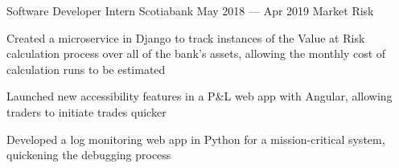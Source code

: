 \begin{cventries}
  \cventry
    {Software Developer Intern}
    {Scotiabank}
    {}
    {May 2018 --- Apr 2019}
    {Market Risk}
    {
      \begin{cvitems}
        \item {Created a microservice in Django to track instances of the Value at Risk calculation process over all of the bank's assets, allowing the monthly cost of calculation runs to be estimated}
        \item {Launched new accessibility features in a P\&L web app with Angular, allowing traders to initiate trades quicker}
        \item {Developed a log monitoring web app in Python for a mission-critical system, quickening the debugging process}
      \end{cvitems}
    }
\end{cventries}
